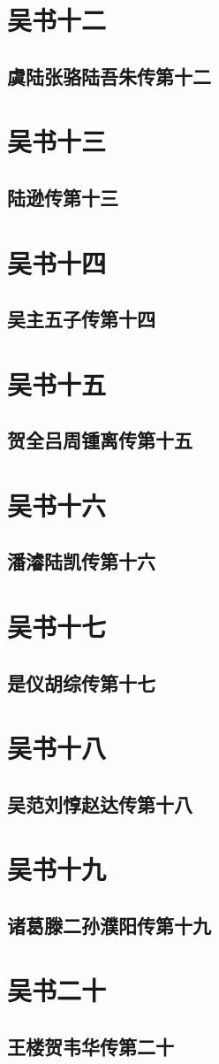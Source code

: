 \documentclass[12pt,UTF8]{ctexbook}
\begin{document}
\part{吴书十二}
\chapter{虞陆张骆陆吾朱传第十二}

\part{吴书十三}
\chapter{陆逊传第十三}

\part{吴书十四}
\chapter{吴主五子传第十四}

\part{吴书十五}
\chapter{贺全吕周锺离传第十五}

\part{吴书十六}
\chapter{潘濬陆凯传第十六}

\part{吴书十七}
\chapter{是仪胡综传第十七}

\part{吴书十八}
\chapter{吴范刘惇赵达传第十八}

\part{吴书十九}
\chapter{诸葛滕二孙濮阳传第十九}

\part{吴书二十}
\chapter{王楼贺韦华传第二十}
\end{document}
